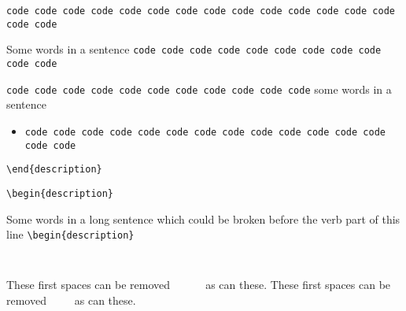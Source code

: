 


\verb|code code code code code code code code code code code code code code code code|


Some words in a sentence
\verb|code code code code code code code code code code code|

\verb|code code code code code code code code code code code| some
words in a sentence


\begin{itemize}
  \item
    \verb|code code code code code code code code code code code code code code code|
\end{itemize}


\verb|\end{description}|

\verb|\begin{description}|


Some words in a long sentence which could be broken before the verb
part of this line \verb|\begin{description}|


\verb|     |

These first spaces can be removed \verb|     | as can these.
These first spaces can be removed\verb|     |as can these.


